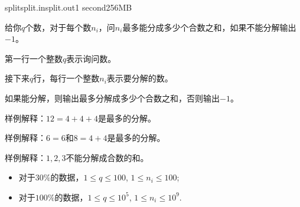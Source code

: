 \documentclass[11pt,a4paper,oneside]{article}
\begin{document}
\begin{problem}{split}{split.in}{split.out}{1 second}{256MB}

    给你$q$个数，对于每个数$n_i$，问$n_i$最多能分成多少个合数之和，如果不能分解输出$-1$。

    \InputFile

	第一行一个整数$q$表示询问数。
	
	接下来$q$行，每行一个整数$n_i$表示要分解的数。

    \OutputFile

	如果能分解，则输出最多分解成多少个合数之和，否则输出$-1$。

    \Example

    \begin{example}
    \end{example}

	样例解释：$12 = 4 + 4 + 4$是最多的分解。

    \begin{example}
	\end{example}

	样例解释：$6 = 6$和$8 = 4 + 4$是最多的分解。

    \begin{example}
	\end{example}

	样例解释：$1,2,3$不能分解成合数的和。

    \Note
    
    \begin{itemize}
		\item 对于$30\%$的数据，$1 \leq q \leq 100$, $1 \leq n_i \leq 100$;
		\item 对于$100\%$的数据，$1 \leq q \leq 10^5$, $1 \leq n_i \leq 10^9$.
    \end{itemize}

\end{problem}
\end{document}
